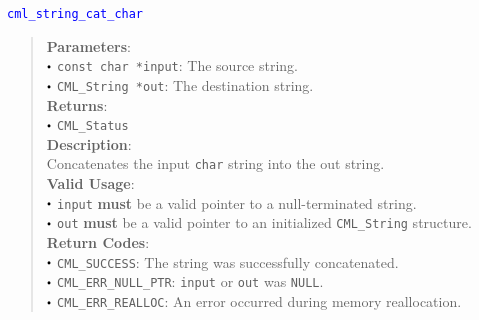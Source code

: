 \documentclass[a4paper,oneside,8pt]{extarticle}
\newcommand{\function}[1]{
  \noindent\textcolor{blue}{\texttt{#1}}
  \vspace{-0.3em}
}
\renewcommand{\dot}{\raisebox{0.3ex}{\scalebox{0.6}{$\bullet$}}}
\theoremstyle{definition}
\begin{document}
\function{cml\_string\_cat\_char}
\begin{quote}
  \textbf{Parameters}: \\
  $\dot$ \texttt{const char *input}: The source string. \\
  $\dot$ \texttt{CML\_String *out}: The destination string. \\
  \textbf{Returns}: \\
  $\dot$ \texttt{CML\_Status} \\

  \vspace{-0.75em}
  \textbf{Description}: \\
  Concatenates the input \texttt{char} string into the out string. \\

  \vspace{-0.75em}
  \textbf{Valid Usage}: \\
  $\dot$ \texttt{input} \textbf{must} be a valid pointer to a null-terminated string. \\
  $\dot$ \texttt{out} \textbf{must} be a valid pointer to an initialized \texttt{CML\_String} structure. \\

  \vspace{-0.75em}
  \textbf{Return Codes}: \\
  $\dot$ \texttt{CML\_SUCCESS}: The string was successfully concatenated. \\
  $\dot$ \texttt{CML\_ERR\_NULL\_PTR}: \texttt{input} or \texttt{out} was \texttt{NULL}. \\
  $\dot$ \texttt{CML\_ERR\_REALLOC}: An error occurred during memory reallocation. \\
\end{quote}
\end{document}
